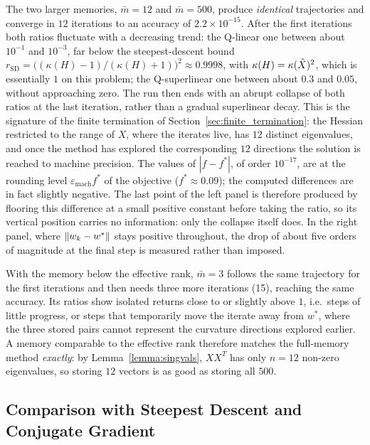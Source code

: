 \noindent The two larger memories, $\bar{m} = 12$ and $\bar{m} = 500$, produce
\emph{identical} trajectories and converge in $12$ iterations to an accuracy
of $2.2 \times 10^{-15}$. After the first iterations both ratios fluctuate
with a decreasing trend: the Q-linear one between about $10^{-1}$ and
$10^{-3}$, far below the steepest-descent bound
$r_{\mathrm{SD}} = \bigl((\kappa(H)-1)/(\kappa(H)+1)\bigr)^2 \approx 0.9998$,
with $\kappa(H) = \kappa(\hat{X})^2$, which is essentially $1$ on this problem;
the Q-superlinear one between about $0.3$ and $0.05$, without approaching
zero. The run then ends with an abrupt collapse of both ratios at the last
iteration, rather than a gradual superlinear decay. This is the signature of
the finite termination of Section~\ref{sec:finite_termination}: the Hessian
restricted to the range of $X$, where the iterates live, has $12$ distinct
eigenvalues, and once the method has explored the corresponding $12$
directions the solution is reached to machine precision. The values of
$|f - f^*|$, of order $10^{-17}$, are at the rounding level
$\varepsilon_{\mathrm{mach}} f^*$ of the objective ($f^* \approx 0.09$); the
computed differences are in fact slightly negative. The last point of the
left panel is therefore produced by flooring this difference at a small
positive constant before taking the ratio, so its vertical position carries
no information: only the collapse itself does. In the right panel, where
$\left\|w_k - w^*\right\|$ stays positive throughout, the drop of about five orders
of magnitude at the final step is measured rather than imposed.

\noindent With the memory below the effective rank, $\bar{m} = 3$ follows the same
trajectory for the first iterations and then needs three more iterations
(15), reaching the same accuracy. Its ratios show isolated returns close to
or slightly above $1$, i.e.\ steps of little progress, or steps that
temporarily move the iterate away from $w^*$, where the three stored pairs
cannot represent the curvature directions explored earlier. A memory
comparable to the effective rank therefore matches the full-memory method
\emph{exactly}: by Lemma~\ref{lemma:singvals}, $XX^T$ has only $n = 12$
non-zero eigenvalues, so storing $12$ vectors is as good as storing all
$500$.


\subsection{Comparison with Steepest Descent and Conjugate Gradient}
\label{sec:exp_baselines}

